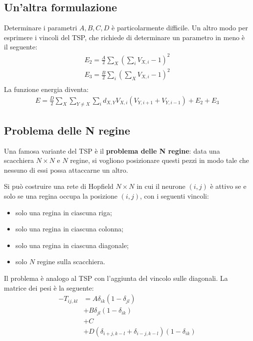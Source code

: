 \subsection{Un'altra formulazione}
\label{sub:un_altra_formulazione}

Determinare i parametri $A, B, C, D$ è particolarmente difficile. Un altro modo per esprimere i vincoli del TSP, che richiede di determinare un parametro in meno è il seguente:
\begin{align*}
	E_2 = \frac{A}{2} \sum_X \left(\sum_i V_{X, i} - 1 \right) ^ 2 \tag{Vincolo sulle righe} \\
	E_3 = \frac{B}{2} \sum_i \left(\sum_X V_{X, i} - 1 \right) ^ 2 \tag{Vincolo sulle colonne} \\
\end{align*}
La funzione energia diventa:
\begin{align*}
	E = \frac{D}{2} \sum_{X} \sum_{Y \neq X} \sum_i d_{X,Y} V_{X,i}(V_{Y, i + 1} + V_{Y, i - 1}) + E_2 + E_3
\end{align*}

\subsection{Problema delle N regine}
\label{sub:problema_delle_n_regine}

Una famosa variante del TSP è il \textbf{problema delle N regine}: data una scacchiera $N \times N$ e $N$ regine, si vogliono posizionare questi pezzi in modo tale che nessuno di essi possa attaccarne un altro.

Si può costruire una rete di Hopfield $N \times N$ in cui il neurone $(i,j)$ è attivo se e solo se una regina occupa la posizione $(i,j)$, con i seguenti vincoli:
\begin{itemize}
	\item solo una regina in ciascuna riga;
	\item solo una regina in ciascuna colonna;
	\item solo una regina in ciascuna diagonale;
	\item solo $N$ regine sulla scacchiera.
\end{itemize}
Il problema è analogo al TSP con l'aggiunta del vincolo sulle diagonali. La matrice dei pesi è la seguente:
\begin{align*}
	- T_{ij,kl} &= A \delta_{ik} (1 - \delta_{jl}) \tag{Peso inibitorio in ogni riga}\\
	& + B \delta_{jl} (1 - \delta_{ik}) \tag{Peso inibitorio in ogni colonna} \\
	& + C \tag{Inibizione globale}\\
	& + D (\delta_{i+j,k-l} + \delta_{i-j, k-l})(1 - \delta_{ik}) \tag{Peso inibitorio sulle diagonale}
\end{align*}

